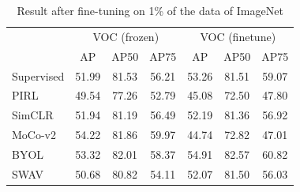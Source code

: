 \begin{table}[H]
	\centering
	\begin{tabular}{l|ccc|ccc|}
		\cline{2-7}
		& \multicolumn{3}{c|}{VOC (frozen)} & \multicolumn{3}{c|}{VOC (finetune)} \\ \cline{2-7} 
		& \multicolumn{1}{c}{AP} & \multicolumn{1}{c}{AP50} & \multicolumn{1}{c|}{AP75} & \multicolumn{1}{c}{AP} & \multicolumn{1}{c}{AP50} & \multicolumn{1}{c|}{AP75} \\ \hline
		\multicolumn{1}{|l|}{Supervised} & 51.99 & 81.53 & 56.21 & 53.26 & 81.51 & 59.07 \\ \hline
		\multicolumn{1}{|l|}{PIRL} & 49.54 & 77.26 & 52.79 & 45.08 & 72.50 & 47.80 \\ \cline{1-1}
		\multicolumn{1}{|l|}{SimCLR} & 51.94 & 81.19 & 56.49 & 52.19 & 81.36 & 56.92 \\ \cline{1-1}
		\multicolumn{1}{|l|}{MoCo-v2} & 54.22 & 81.86 & 59.97 & 44.74 & 72.82 & 47.01 \\ \cline{1-1}
		\multicolumn{1}{|l|}{BYOL} & 53.32 & 82.01 & 58.37 & 54.91 & 82.57 & 60.82 \\ \cline{1-1}
		\multicolumn{1}{|l|}{SWAV} & 50.68 & 80.82 & 54.11 & 52.07 & 81.50 & 56.03 \\ 
		\hline
	\end{tabular}
	\caption{Result after fine-tuning on 1\% of the data of ImageNet}
	\label{tab:object-detection-swav}
\end{table}

